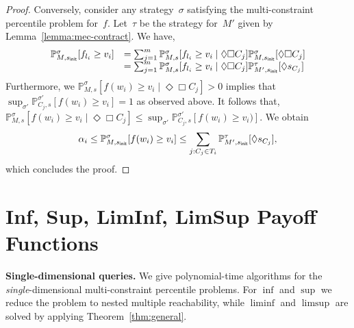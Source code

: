 \documentclass{llncs}
\newcommand{\initState}{\ensuremath{s_{{\sf init}}} }
\newcommand*{\pr}{\mathbb{P}}
\begin{document}
\begin{proof}
  Conversely, consider any strategy~$\sigma$ satisfying the multi-constraint percentile problem for~$f$. Let~$\tau$ be the strategy 
  for~$M'$ given by Lemma~\ref{lemma:mec-contract}.
  We have,
  \[\begin{array}{ll}
  \pr_{M,\initState}^\sigma[ f_{l_i} \geq v_i ] &= \sum_{j=1}^m \pr_{M,s}^\sigma[ f_{l_i} \geq v_i \mid \Diamond\Box C_j] \pr_{M,\initState}^\sigma[\Diamond\Box C_j]\\
  &= \sum_{j=1}^m \pr_{M,s}^\sigma[ f_{l_i} \geq v_i \mid \Diamond\Box C_j] \pr_{M',\initState}^\tau[\Diamond s_{C_j}]
\end{array}
\]
Furthermore, we $\pr_{M,s}^\sigma[ f(w_i) \geq v_i \mid \Diamond\Box C_j]>0$ implies that
$\sup_{\sigma'} \pr_{C_j,s}^{\sigma'}[f(w_i)\geq v_i] = 1$ as observed above. It follows that,
$\pr_{M,s}^\sigma[ f(w_i) \geq v_i \mid \Diamond\Box C_j] \leq \sup_{\sigma'}\pr_{C_j,s}^{\sigma'}[f(w_i)\geq v_i)]$.
We obtain 
\[\alpha_i \leq \pr_{M,\initState}^\sigma[ f(w_i)\geq v_i ]\leq \sum_{j : C_j \in T_i} \pr_{M',\initState}^\tau[\Diamond s_{C_j}],\]
which concludes the proof.
\end{proof}

\section{Inf, Sup, LimInf, LimSup Payoff Functions}
\label{section:quant-reg}
\label{subsection:single-simple}

\smallskip\noindent\textbf{Single-dimensional queries.} We give polynomial-time algorithms for the \emph{single}-dimensional multi-cons\-traint percentile problems.
For $\inf$ and $\sup$ we reduce the problem to nested multiple reachability, while $\liminf$ and $\limsup$ are solved by applying Theorem~\ref{thm:general}. 
\end{document}
